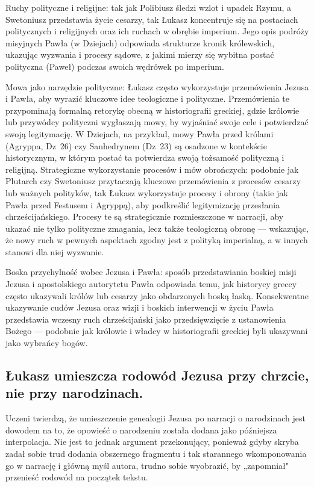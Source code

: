 Ruchy polityczne i religijne: tak jak Polibiusz śledzi wzlot i upadek Rzymu, a Swetoniusz przedstawia życie cesarzy, tak Łukasz koncentruje się na postaciach politycznych i religijnych oraz ich ruchach w obrębie imperium.
Jego opis podróży misyjnych Pawła (w Dziejach) odpowiada strukturze kronik królewskich, ukazując wyzwania i procesy sądowe, z jakimi mierzy się wybitna postać polityczna (Paweł) podczas swoich wędrówek po imperium.

Mowa jako narzędzie polityczne: Łukasz często wykorzystuje przemówienia Jezusa i Pawła, aby wyrazić kluczowe idee teologiczne i polityczne.
Przemówienia te przypominają formalną retorykę obecną w historiografii greckiej, gdzie królowie lub przywódcy polityczni wygłaszają mowy, by wyjaśniać swoje cele i potwierdzać swoją legitymację.
W Dziejach, na przykład, mowy Pawła przed królami (Agryppa, Dz~26) czy Sanhedrynem (Dz~23) są osadzone w kontekście historycznym, w którym postać ta potwierdza swoją tożsamość polityczną i religijną.
Strategiczne wykorzystanie procesów i mów obrończych: podobnie jak Plutarch czy Swetoniusz przytaczają kluczowe przemówienia z procesów cesarzy lub ważnych polityków, tak Łukasz wykorzystuje procesy i obrony (takie jak Pawła przed Festusem i Agryppą), aby podkreślić legitymizację przesłania chrześcijańskiego.
Procesy te są strategicznie rozmieszczone w narracji, aby ukazać nie tylko polityczne zmagania, lecz także teologiczną obronę — wskazując, że nowy ruch w pewnych aspektach zgodny jest z polityką imperialną, a w innych stanowi dla niej wyzwanie.

Boska przychylność wobec Jezusa i Pawła: sposób przedstawiania boskiej misji Jezusa i apostolskiego autorytetu Pawła odpowiada temu, jak historycy greccy często ukazywali królów lub cesarzy jako obdarzonych boską łaską.
Konsekwentne ukazywanie cudów Jezusa oraz wizji i boskich interwencji w życiu Pawła przedstawia wczesny ruch chrześcijański jako przedsięwzięcie z ustanowienia Bożego — podobnie jak królowie i władcy w historiografii greckiej byli ukazywani jako wybrańcy bogów.

\subsection{Łukasz umieszcza rodowód Jezusa przy chrzcie, nie przy narodzinach.}\label{subsec:luke-places-the-lineage-of-jesus-at-the-baptism-not-at-the-birth.}

Uczeni twierdzą, że umieszczenie genealogii Jezusa po narracji o narodzinach jest dowodem na to, że opowieść o narodzeniu została dodana jako późniejsza interpolacja.
Nie jest to jednak argument przekonujący, ponieważ gdyby skryba zadał sobie trud dodania obszernego fragmentu i tak starannego wkomponowania go w narrację i główną myśl autora, trudno sobie wyobrazić, by „zapomniał" przenieść rodowód na początek tekstu.

